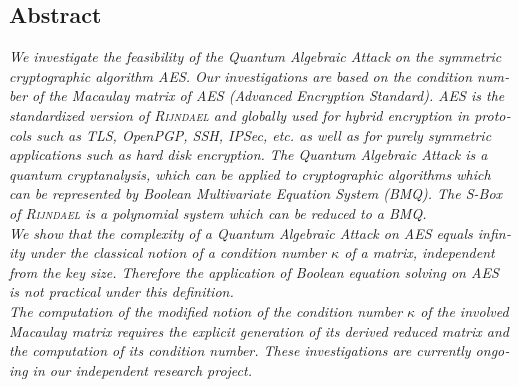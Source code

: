 \documentclass[a4paper,11pt]{article}
\begin{document}
\begin{otherlanguage}{english}

\vspace{3mm}



\section{Abstract}

\noindent
\textit{We investigate the feasibility of the Quantum Algebraic Attack \cite{QAA} on the symmetric cryptographic algorithm \textsc{AES}. Our investigations are based on the condition number of the Macaulay matrix of  \textsc{AES} (Advanced Encryption Standard). \textsc{AES} is the standardized version of \textsc{Rijndael} and globally used for hybrid encryption in protocols such as TLS, OpenPGP, SSH, IPSec, etc. as well as for purely symmetric applications such as hard disk encryption. The Quantum Algebraic Attack is a quantum cryptanalysis, which can be applied to cryptographic algorithms which can be represented by Boolean Multivariate Equation System (BMQ). The S-Box of \textsc{Rijndael} is a polynomial system which can be reduced to a BMQ.} \\

\noindent
\textit{We show that the complexity of a Quantum Algebraic Attack on \textsc{AES} equals infinity under the classical notion of a condition number $\kappa$ of a matrix, independent from the key size. Therefore the application of Boolean equation solving \cite{QAA} on \textsc{AES} is not practical under this definition. } \\

\noindent
\textit{The computation of the modified notion of the condition number $\kappa$ of the involved Macaulay matrix requires the explicit generation of its derived reduced matrix and the computation of its condition number. These investigations are currently ongoing in our independent research project. } \\




\end{otherlanguage}
\end{document}
